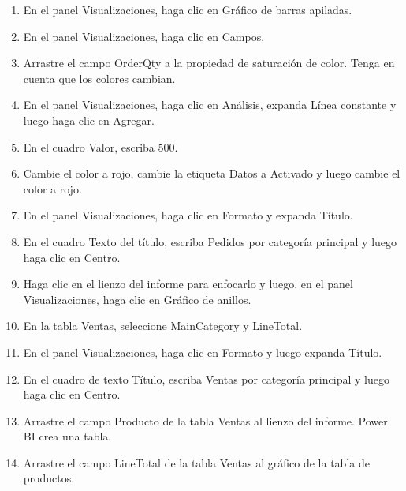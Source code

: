 \documentclass[12pt,letterpaper]{article}
\begin{document}
\begin{enumerate}
    \item En el panel Visualizaciones, haga clic en Gráfico de barras apiladas.
    
    \item En el panel Visualizaciones, haga clic en Campos.
    \item Arrastre el campo OrderQty a la propiedad de saturación de color. Tenga en cuenta que los colores cambian.
    
    \item En el panel Visualizaciones, haga clic en Análisis, expanda Línea constante y luego haga clic en Agregar.

    \item En el cuadro Valor, escriba 500.
    
    
    
    
    \item Cambie el color a rojo, cambie la etiqueta Datos a Activado y luego cambie el color a rojo.
    
    \item En el panel Visualizaciones, haga clic en Formato y expanda Título.
    
    \item En el cuadro Texto del título, escriba Pedidos por categoría principal y luego haga clic en Centro.

    \item Haga clic en el lienzo del informe para enfocarlo y luego, en el panel Visualizaciones, haga clic en Gráfico de anillos.
    
    \item En la tabla Ventas, seleccione MainCategory y LineTotal.
    \item En el panel Visualizaciones, haga clic en Formato y luego expanda Título.
    \item En el cuadro de texto Título, escriba Ventas por categoría principal y luego haga clic en Centro.


    \item Arrastre el campo Producto de la tabla Ventas al lienzo del informe. Power BI crea una tabla.
    \item Arrastre el campo LineTotal de la tabla Ventas al gráfico de la tabla de productos.
    
    
    
    
    
    
    
    
    
    
    
    
    

\end{enumerate}
\end{document}
